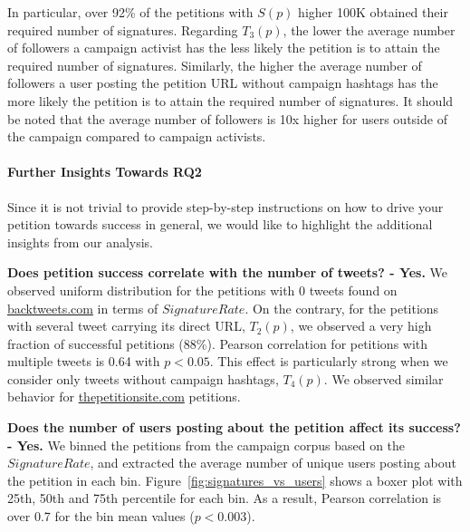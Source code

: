 In particular, over 92\% of the petitions with $S(p)$ higher 100K obtained their required number of signatures.
Regarding $T_3(p)$, the lower the average number of followers a campaign activist has the less likely the petition is to attain the required number of signatures.
Similarly, the higher the average number of followers a user posting the petition URL without campaign hashtags has the more likely the petition is to attain the required number of signatures.
It should be noted that the average number of followers is 10x higher for users outside of the campaign compared to campaign activists. 

\paragraph{Further Insights Towards RQ2}
Since it is not trivial to provide step-by-step instructions on how to drive your petition towards success in general, we would like to highlight the additional insights from our analysis.


\textbf{Does petition success correlate with the number of tweets? - Yes.} We observed uniform distribution for the petitions with 0 tweets found on \url{backtweets.com} in terms of $SignatureRate$. On the contrary, for the petitions with several tweet carrying its direct URL, $T_2(p)$, we observed a very high fraction of successful petitions (88\%). Pearson correlation for petitions with multiple tweets is 0.64 with \(p < 0.05\). This effect is particularly strong when we consider only tweets without campaign hashtags, $T_4(p)$. We observed similar behavior for \url{thepetitionsite.com} petitions.

\textbf{Does the number of users posting about the petition affect its success? - Yes.} We binned the petitions from the campaign corpus based on the $SignatureRate$, and extracted the average number of unique users posting about the petition in each bin. Figure~\ref{fig:signatures_vs_users} shows a boxer plot with 25th, 50th and 75th percentile for each bin. As a result, Pearson correlation is over 0.7 for the bin mean values (\(p < 0.003\)).

